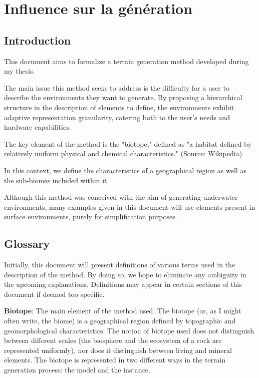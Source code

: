 \chapter{Influence sur la génération}
\minitoc


\section{Introduction}
This document aims to formalize a terrain generation method developed during my thesis.

The main issue this method seeks to address is the difficulty for a user to describe the environments they want to generate. By proposing a hierarchical structure in the description of elements to define, the environments exhibit adaptive representation granularity, catering both to the user's needs and hardware capabilities.

The key element of the method is the "biotope," defined as "a habitat defined by relatively uniform physical and chemical characteristics." (Source: Wikipedia)

In this context, we define the characteristics of a geographical region as well as the sub-biomes included within it.

Although this method was conceived with the aim of generating underwater environments, many examples given in this document will use elements present in surface environments, purely for simplification purposes.

\section{Glossary}
Initially, this document will present definitions of various terms used in the description of the method. By doing so, we hope to eliminate any ambiguity in the upcoming explanations. Definitions may appear in certain sections of this document if deemed too specific.

\textbf{Biotope}: The main element of the method used. The biotope (or, as I might often write, the biome) is a geographical region defined by topographic and geomorphological characteristics. The notion of biotope used does not distinguish between different scales (the biosphere and the ecosystem of a rock are represented uniformly), nor does it distinguish between living and mineral elements. The biotope is represented in two different ways in the terrain generation process: the model and the instance.

